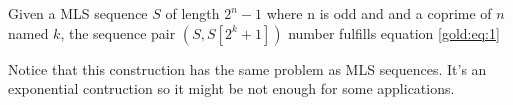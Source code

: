 \begin{property}
  Given a MLS sequence $S$ of length $2^n - 1$ where n is odd and and a
  coprime of $n$ named $k$, the sequence pair $(S, S[2^{k} + 1])$ number
  fulfills equation \ref{gold:eq:1}
\end{property}

Notice that this construction has the same problem as MLS sequences. It's
an exponential contruction so it might be not enough for some applications.
